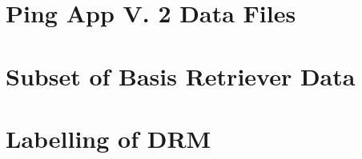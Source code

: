 \documentclass[12pt]{article} %
\begin{document}
\newpage
\begin{figure}[H]
 \centering 
 
\end{figure}

\newpage
\begin{figure}[H]
 \centering 
 
\end{figure}

\newpage
\section{Ping App V. 2 Data Files} \label{sec:ping}
\begin{figure}[H]
 \centering 
 
\end{figure}

\newpage
\begin{figure}[H]
 \centering 
 
\end{figure}

\newpage
\begin{figure}[H]
 \centering 
 
\end{figure}

\newpage
\begin{figure}[H]
 \centering 
 
\end{figure}

\newpage
\begin{figure}[H]
 \centering 
 
\end{figure}

\newpage
\begin{figure}[H]
 \centering 
 
\end{figure}

\newpage
\section{Subset of Basis Retriever Data} \label{sec:subset}
\begin{figure}[H]
 \centering 
 
\end{figure}



\newpage
\section{Labelling of DRM} \label{sec:drm}


%
\end{document}
